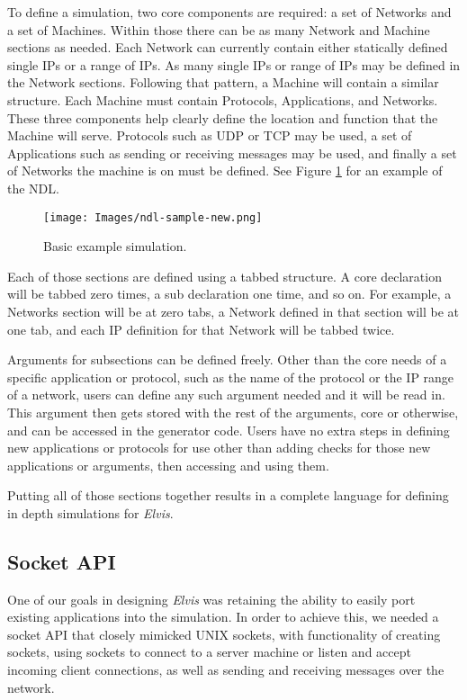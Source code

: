 \documentclass[journal]{IEEEtran} %
\newcommand{\elvis}{\textit{Elvis}}
\begin{document}
To define a simulation, two core components are required: a set of Networks and a set of Machines. Within those there can be as  many Network and Machine sections as needed. Each Network can currently contain either statically defined single IPs or a range of IPs. As many single IPs or range of IPs may be defined in the Network sections. Following that pattern, a Machine will contain a similar structure. Each Machine must contain Protocols, Applications, and Networks. These three components help clearly define the location and function that the Machine will serve. Protocols such as UDP or TCP may be used, a set of Applications such as sending or receiving messages may be used, and finally a set of Networks the machine is on must be defined. See Figure \ref{fig:basic} for an example of the NDL.

\begin{figure}[htbp]
    \centerline{\texttt{[image: Images/ndl-sample-new.png]}}
    \caption{Basic example simulation.}
    \label{fig:basic}
\end{figure}

Each of those sections are defined using a tabbed structure. A core declaration will be tabbed zero times, a sub declaration one time, and so on. For example, a Networks section will be at zero tabs, a Network defined in that section will be at one tab, and each IP definition for that Network will be tabbed twice.

Arguments for subsections can be defined freely. Other than the core needs of a specific application or protocol, such as the name of the protocol or the IP range of a network, users can define any such argument needed and it will be read in. This argument then gets stored with the rest of the arguments, core or otherwise, and can be accessed in the generator code. Users have no extra steps in defining new applications or protocols for use other than adding checks for those new applications or arguments, then accessing and using them.

Putting all of those sections together results in a complete language for defining in depth simulations for \elvis{}. 

\subsection{Socket API}

One of our goals in designing \elvis{} was retaining the ability to easily port existing applications into the simulation. In order to achieve this, we needed a socket API that closely mimicked UNIX sockets, with functionality of creating sockets, using sockets to connect to a server machine or listen and accept incoming client connections, as well as sending and receiving messages over the network.
\end{document}
